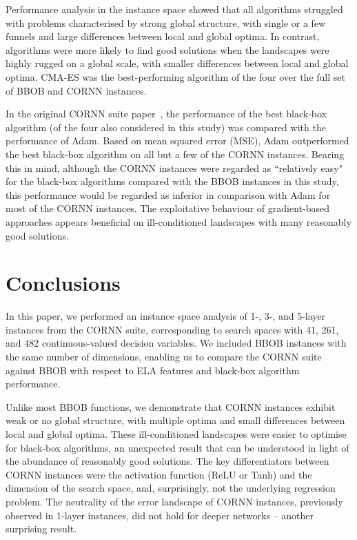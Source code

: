 \documentclass[acmsmall,screen,review,anonymous]{acmart}
\begin{document}
Performance analysis in the instance space showed that all algorithms struggled with problems characterised by strong global structure, with single or a few funnels and large differences between local and global optima. In contrast, algorithms were more likely to find good solutions when the landscapes were highly rugged on a global scale, with smaller differences between local and global optima. CMA-ES was the best-performing algorithm of the four over the full set of BBOB and CORNN instances.

In the original CORNN suite paper~\cite{Malan2022}, the performance of the best black-box algorithm (of the four also considered in this study) was compared
with the performance of Adam. Based on mean squared error (MSE), Adam outperformed the best black-box algorithm on all but a few of the CORNN instances. Bearing this in mind, although the CORNN instances were regarded as ``relatively easy" for the black-box algorithms compared with the BBOB instances in this study, this performance would be regarded as inferior in comparison with Adam for most of the CORNN instances. The exploitative behaviour of gradient-based approaches appears beneficial on ill-conditioned landscapes with many reasonably good solutions.
\section{Conclusions}\label{sec:conclusion}
In this paper, we performed an instance space analysis of 1-, 3-, and 5-layer instances from the CORNN suite, corresponding to search spaces with 41, 261, and 482 continuous-valued decision variables. We included BBOB instances with the same number of dimensions, enabling us to compare the CORNN suite against BBOB with respect to ELA features and black-box algorithm performance. 

Unlike most BBOB functions, we demonstrate that CORNN instances exhibit weak or no global structure, with multiple optima and small differences between local and global optima. These ill-conditioned landscapes were easier to optimise for black-box algorithms, an unexpected result that can be understood in light of the abundance of reasonably good solutions. The key differentiators between CORNN instances were the activation function (ReLU or Tanh) and the dimension of the search space, and, surprisingly, not the underlying regression problem. The neutrality of the error landscape of CORNN instances, previously observed in 1-layer instances, did not hold for deeper networks -- another surprising result. 
\end{document}
